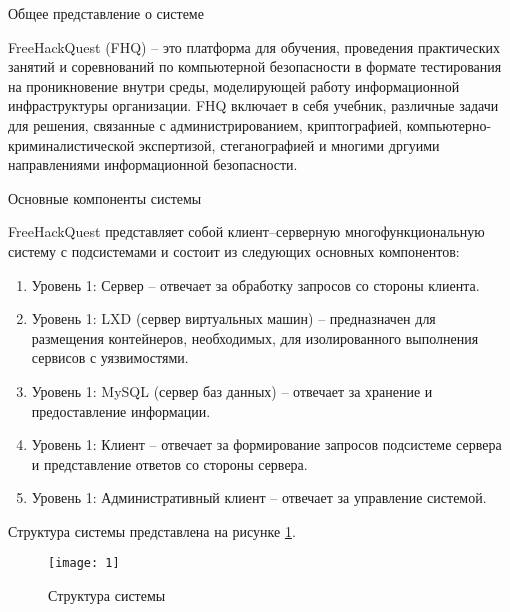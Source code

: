 \begin{center}
Общее представление о системе
\end{center}

\vspace{\baselineskip}

FreeHackQuest (FHQ) -- это платформа для обучения, проведения практических занятий и соревнований по компьютерной безопасности в формате тестирования на проникновение внутри среды, моделирующей работу информационной инфраструктуры организации. FHQ включает в себя учебник, различные задачи для решения, связанные с администрированием, криптографией, компьютерно-криминалистической экспертизой, стеганографией и многими дргуими направлениями информационной безопасности.\par

\begin{center}
Основные компоненты системы
\end{center}

\vspace{\baselineskip}

FreeHackQuest представляет собой клиент–серверную многофункциональную систему с подсистемами и состоит из следующих основных компонентов:
\begin{enumerate}
\item Уровень 1: Сервер -- отвечает за обработку запросов со стороны клиента.
\item Уровень 1: LXD (сервер виртуальных машин) -- предназначен для размещения контейнеров, необходимых, для изолированного выполнения сервисов с уязвимостями.
\item Уровень 1: MySQL (сервер баз данных) -- отвечает за хранение и предоставление информации.
\item Уровень 1: Клиент -- отвечает за формирование запросов подсистеме сервера и представление ответов со стороны сервера.
\item Уровень 1: Административный клиент -- отвечает за управление системой.
\end{enumerate}

\vspace{\baselineskip}

Структура системы представлена на рисунке \ref{img:1}.

\begin{figure}[h!]
        \centering
        \texttt{[image: 1]}
        \caption{Структура системы}
        \label{img:1}
\end{figure}

